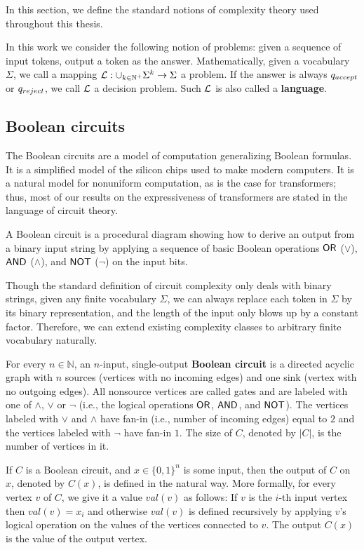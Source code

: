 In this section, we define the standard notions of complexity theory used throughout this thesis.

\begin{definition}[Language]
    In this work we consider the following notion of problems: given a sequence of input tokens, output a token as the answer. 
    Mathematically, given a vocabulary $\Sigma$, we call a mapping $\mathcal{L}:\cup_{k\in\mathbb{N}^+}\Sigma^k\to\Sigma$ a problem. 
    If the answer is always $q_{accept}$ or $q_{reject}$, we call $\mathcal{L}$ a decision problem.
    Such $\mathcal{L}$ is also called a \textbf{language}.
\end{definition}

\subsection{Boolean circuits}

The Boolean circuits are a model of computation generalizing Boolean formulas.
It is a simplified model of the silicon chips used to make modern computers. 
It is a natural model for nonuniform computation, as is the case for transformers; thus, most of our results on the expressiveness of transformers are stated in the language of circuit theory.


A Boolean circuit is a procedural diagram showing how to derive an output from a binary input string by applying a sequence of basic Boolean operations $\mathsf{OR}$ ($\lor$), $\mathsf{AND}$ ($\land$), and $\mathsf{NOT}$ ($\lnot$) on the input bits.

Though the standard definition of circuit complexity only deals with binary strings, given any finite vocabulary $\Sigma$, we can always replace each token in $\Sigma$ by its binary representation, and the length of the input only blows up by a constant factor. 
Therefore, we can extend existing complexity classes to arbitrary finite vocabulary naturally. 

\begin{definition} 
    For every $n \in \mathbb{N}$, an $n$-input, single-output \textbf{Boolean circuit} is a directed acyclic graph with $n$ sources (vertices with no incoming edges) and one sink (vertex with no outgoing edges). 
    All nonsource vertices are called gates and are labeled with one of $\land$, $\lor$ or $\lnot$ (i.e., the logical operations $\mathsf{OR}$, $\mathsf{AND}$, and $\mathsf{NOT}$).
    The vertices labeled with $\lor$ and $\land$ have fan-in (i.e., number of incoming edges) equal to $2$ and the vertices labeled with $\lnot$ have fan-in $1$. 
    The size of $C$, denoted by $|C|$, is the number of vertices in it.

    If $C$ is a Boolean circuit, and $x \in \{0,1\}^n$ is some input, then the output of $C$ on $x$, denoted by $C(x)$, is defined in the natural way. 
    More formally, for every vertex $v$ of $C$, we give it a value $val(v)$ as follows: 
    If $v$ is the $i$-th input vertex then $val(v) = x_i$ and otherwise $val(v)$ is defined recursively by applying $v$'s logical operation on the values of the vertices connected to $v$. 
    The output $C(x)$ is the value of the output vertex.
\end{definition}

